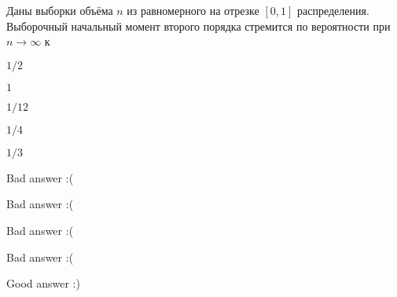 
\begin{question}
Даны выборки объёма \(n\) из равномерного на отрезке \([0,1]\)
распределения. Выборочный начальный момент второго порядка стремится по
вероятности при \(n \stackrel{}{\to} \infty\) к
\begin{answerlist}
  \item \(1/2\)
  \item \(1\)
  \item \(1/12\)
  \item \(1/4\)
  \item \(1/3\)
\end{answerlist}
\end{question}

\begin{solution}
\begin{answerlist}
  \item Bad answer :(
  \item Bad answer :(
  \item Bad answer :(
  \item Bad answer :(
  \item Good answer :)
\end{answerlist}
\end{solution}

